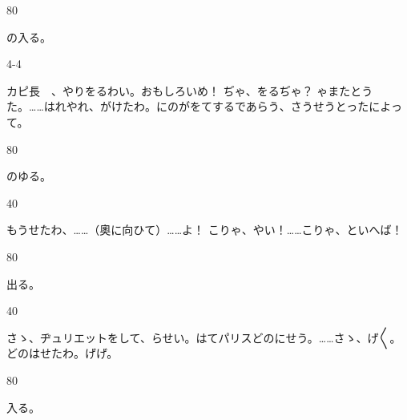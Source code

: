 \documentclass[tate,paper=b6j,jafontsize=9pt]{jlreq}
\begin{document}
\begin{azconvIndented}{8\zw}{0\zw}

の入る。

\end{azconvIndented}
\begin{azconvIndented}{4\zw}{-4\zw}

カピ長　、やりをるわい。おもしろいめ！ ぢゃ、をるぢゃ？ ゃまたとうた。……はれやれ、がけたわ。にのがをてするであらう、さうせうとったによって。

\end{azconvIndented}
\begin{azconvIndented}{8\zw}{0\zw}

のゆる。

\end{azconvIndented}
\begin{azconvIndented}{4\zw}{0\zw}

もうせたわ、……（奧に向ひて）……よ！ こりゃ、やい！……こりゃ、といへば！

\end{azconvIndented}
\begin{azconvIndented}{8\zw}{0\zw}

出る。

\end{azconvIndented}
\begin{azconvIndented}{4\zw}{0\zw}

さゝ、ヂュリエットをして、らせい。はてパリスどのにせう。……さゝ、げ{〳〵}。どのはせたわ。げげ。

\end{azconvIndented}
\begin{azconvIndented}{8\zw}{0\zw}

入る。

\end{azconvIndented}
\end{document}
